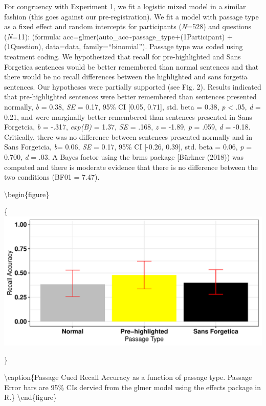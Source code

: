 \documentclass[english,pdf]{apa6}
\begin{document}
For congruency with Experiment 1, we fit a logistic mixed model in a similar fashion (this goes against our pre-registration). We fit a model with passage type as a fixed effect and random intercepts for participants (\emph{N}=528) and questions (\emph{N}=11): (formula: acc=glmer(auto\_acc\textasciitilde{}passage\_type+(1\textbar{}Participant) + (1\textbar{}Question), data=data, family=\enquote{binomial}). Passage type was coded using treatment coding. We hypothesized that recall for pre-highlighted and Sans Forgetica sentences would be better remembered than normal sentences and that there would be no recall differences between the highlighted and sans forgetia sentences. Our hypotheses were partially supported (see Fig. 2). Results indicated that pre-highlighted sentences were better remembered than sentences presented normally, \emph{b} = 0.38, \emph{SE} = 0.17, 95\% CI {[}0.05, 0.71{]}, std. beta = 0.38, \emph{p} \textless{} .05, \emph{d} = 0.21, and were marginally better remembered than sentences presented in Sans Forgetcia, \emph{b} = -.317, \emph{exp(B)} = 1.37, \emph{SE} = .168, \emph{z} = -1.89, \emph{p} = .059, \emph{d} = -0.18. Critically, there was no difference between sentences presented normally and in Sans Forgetcia, \emph{b}= 0.06, \emph{SE} = 0.17, 95\% CI {[}-0.26, 0.39{]}, std. beta = 0.06, \emph{p} = 0.700, \emph{d} = .03. A Bayes factor using the brms package {[}Bürkner (2018)) was computed and there is moderate evidence that there is no difference between the two conditions (BF01 = 7.47).

\textbackslash{}begin\{figure\}

\{\centering \includegraphics{SF_Paper_files/figure-latex/unnamed-chunk-3-1}

\}

\textbackslash{}caption\{Passage Cued Recall Accuracy as a function of passage type. Passage Error bars are 95\% CIs dervied from the glmer model using the effects package in R.\}\label{fig:unnamed-chunk-3}
\textbackslash{}end\{figure\}
\end{document}
